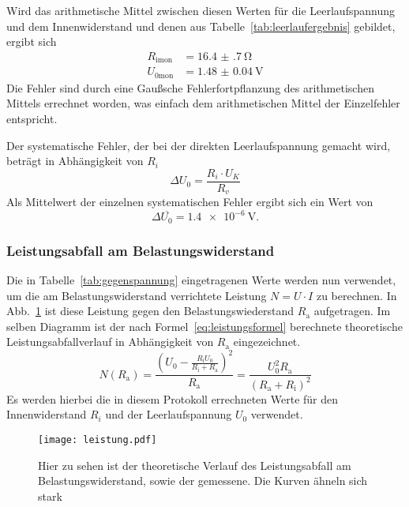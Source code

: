 Wird das arithmetische Mittel zwischen diesen 
Werten für die Leerlaufspannung und dem Innenwiderstand 
und denen aus Tabelle~\ref{tab:leerlaufergebnis} gebildet, 
ergibt sich 
\begin{align*}
R_\text{imon}&=\SI{16.4(7)}{\ohm}\\
U_\text{0mon}&=\SI{1.48(4)}{\volt}
\end{align*}
Die Fehler sind durch eine Gaußsche Fehlerfortpflanzung des arithmetischen 
Mittels errechnet worden, was einfach dem arithmetischen Mittel der 
Einzelfehler entspricht.


Der systematische Fehler, der bei der direkten Leerlaufspannung 
gemacht wird, beträgt in Abhängigkeit von $R_{i}$
\begin{equation*}
\Delta U_{0} = \frac{R_{i}\cdot U_{K}}{R_{v}}
\end{equation*}
Als Mittelwert der einzelnen systematischen Fehler ergibt sich ein 
Wert von 
\begin{equation*}
\Delta \overline{U_{0}} = \SI{1.4e-6}{\volt}.
\end{equation*}
%
\subsubsection{Leistungsabfall am Belastungswiderstand}
Die in Tabelle~\ref{tab:gegenspannung} eingetragenen Werte werden nun 
verwendet, um die am Belastungswiderstand verrichtete Leistung 
$N = U\cdot I$ zu berechnen. In Abb.~\ref{fig:leistung} ist diese Leistung 
gegen den Belastungswiederstand $R_\text{a}$ aufgetragen. 
Im selben Diagramm ist der nach Formel~\eqref{eq:leistungsformel} 
berechnete theoretische Leistungsabfallverlauf in Abhängigkeit von 
$R_\text{a}$ eingezeichnet.
\begin{equation}
\label{eq:leistungsformel}
N(R_\text{a})=\frac{(U_{0}-\frac{R_\text{i}U_{0}}
{R_\text{i}+R_\text{a}})^2}{R_\text{a}} = \frac{U_{0}^2R_\text{a}}
{(R_\text{a} + R_\text{i})^2}
\end{equation}
Es werden hierbei die in diesem Protokoll errechneten Werte für den 
Innenwiderstand $R_{i}$ und der Leerlaufspannung $U_{0}$ 
verwendet.

\begin{figure}[]
\centering
\texttt{[image: leistung.pdf]}
\caption{Hier zu sehen ist der theoretische Verlauf des Leistungsabfall 
am Belastungswiderstand, sowie der gemessene. Die Kurven ähneln sich 
stark}
\label{fig:leistung}
\end{figure}
\FloatBarrier